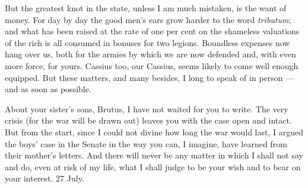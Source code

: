  But the greatest knot in the state, unless I am much mistaken, is the want of money. For day by day the good men's ears grow harder to the word \textit{tributum}; and what has been raised at the rate of one per cent on the shameless valuations of the rich is all consumed in bonuses for two legions. Boundless expenses now hang over us, both for the armies by which we are now defended and, with even more force, for yours. Cassius too, our Cassius, seems likely to come well enough equipped. But these matters, and many besides, I long to speak of in person --- and as soon as possible.

 About your sister's sons, Brutus, I have not waited for you to write. The very crisis (for the war will be drawn out) leaves you with the case open and intact. But from the start, since I could not divine how long the war would last, I argued the boys' case in the Senate in the way you can, I imagine, have learned from their mother's letters. And there will never be any matter in which I shall not say and do, even at risk of my life, what I shall judge to be your wish and to bear on your interest. 27 July.

